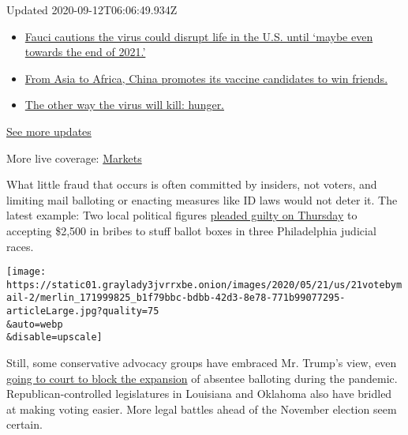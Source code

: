 Updated 2020-09-12T06:06:49.934Z

\begin{itemize}
\tightlist
\item
  \href{https://www.nytimes3xbfgragh.onion/2020/09/11/world/covid-19-coronavirus.html?action=click\&pgtype=Article\&state=default\&region=MAIN_CONTENT_1\&context=storylines_live_updates\#link-dfb8a16}{Fauci
  cautions the virus could disrupt life in the U.S. until `maybe even
  towards the end of 2021.'}
\item
  \href{https://www.nytimes3xbfgragh.onion/2020/09/11/world/covid-19-coronavirus.html?action=click\&pgtype=Article\&state=default\&region=MAIN_CONTENT_1\&context=storylines_live_updates\#link-7104d154}{From
  Asia to Africa, China promotes its vaccine candidates to win friends.}
\item
  \href{https://www.nytimes3xbfgragh.onion/2020/09/11/world/covid-19-coronavirus.html?action=click\&pgtype=Article\&state=default\&region=MAIN_CONTENT_1\&context=storylines_live_updates\#link-393ad215}{The
  other way the virus will kill: hunger.}
\end{itemize}

\href{https://www.nytimes3xbfgragh.onion/2020/09/11/world/covid-19-coronavirus.html?action=click\&pgtype=Article\&state=default\&region=MAIN_CONTENT_1\&context=storylines_live_updates}{See
more updates}

More live coverage:
\href{https://www.nytimes3xbfgragh.onion/live/2020/09/11/business/stock-market-today-coronavirus?action=click\&pgtype=Article\&state=default\&region=MAIN_CONTENT_1\&context=storylines_live_updates}{Markets}

What little fraud that occurs is often committed by insiders, not
voters, and limiting mail balloting or enacting measures like ID laws
would not deter it. The latest example: Two local political figures
\href{https://www.inquirer.com/news/voter-fraud-philadelphia-ward-leader-judge-of-elections-domenick-demuro-guilty-plea-20200521.html}{pleaded
guilty on Thursday} to accepting \$2,500 in bribes to stuff ballot boxes
in three Philadelphia judicial races.

\texttt{[image: https://static01.graylady3jvrrxbe.onion/images/2020/05/21/us/21votebymail-2/merlin\_171999825\_b1f79bbc-bdbb-42d3-8e78-771b99077295-articleLarge.jpg?quality=75\\\&auto=webp\\\&disable=upscale]}

Still, some conservative advocacy groups have embraced Mr. Trump's view,
even
\href{https://truethevote.org/true-the-vote-continues-battle-to-protect-voters-in-nevada-and-virginia/}{going
to court to block the expansion} of absentee balloting during the
pandemic. Republican-controlled legislatures in Louisiana and Oklahoma
also have bridled at making voting easier. More legal battles ahead of
the November election seem certain.

